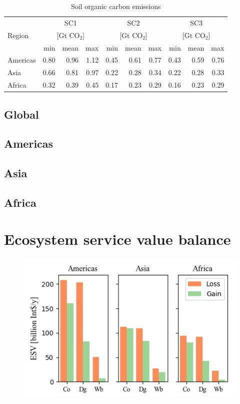 		
		\begin{table}[ht]
			\centering
			\caption[Soil organic carbon emissions]{Soil organic carbon emissions}
			\label{tab:soce_tab}
			\begin{tabular}{lrrrrrrrrr}
				\hline
				\multirow{3}{*}{Region} & \multicolumn{3}{c}{SC1}& \multicolumn{3}{c}{SC2} & \multicolumn{3}{c}{SC3} \\
				& \multicolumn{3}{c}{[Gt CO$_2$]}& \multicolumn{3}{c}{[Gt CO$_2$]} & \multicolumn{3}{c}{[Gt CO$_2$]} \\
				& min & mean & max & min & mean & max & min & mean & max \\\hline
				Americas & 0.80 & 0.96 & 1.12 & 0.45 & 0.61 & 0.77 & 0.43 & 0.59 & 0.76 \\
				Asia & 0.66 & 0.81 & 0.97 & 0.22 & 0.28 & 0.34 & 0.22 & 0.28 & 0.33 \\
				Africa & 0.32 & 0.39 & 0.45 & 0.17 & 0.23 & 0.29 & 0.16 & 0.23 & 0.29 \\\hline
			\end{tabular}
		\end{table}

		\subsection{Global}
		\subsection{Americas}
		\subsection{Asia}
		\subsection{Africa}

	\section{Ecosystem service value balance}

		\begin{figure}[ht]
			\centering
			\includegraphics[scale=1]{img/esv}
			\caption[Ecosystem service values]{}
			\label{fig:esv}
		\end{figure}

